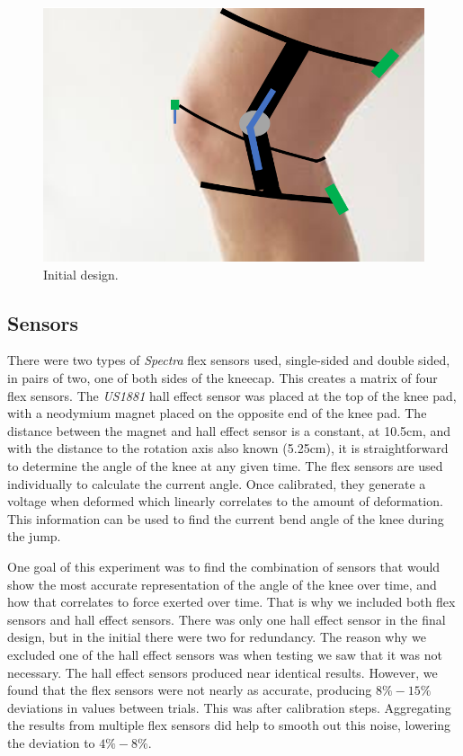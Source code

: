 \documentclass[manuscript,screen,review]{acmart}
\begin{document}
\begin{figure}[ht]
  \centering
  \includegraphics[width=0.5\linewidth]{images/initial_design.png}
  \caption{Initial design.}
  \label{fig:initial_design}
\end{figure}

\subsection{Sensors}

There were two types of \textit{Spectra} flex sensors used, single-sided and double sided, in pairs of two, one of both sides of the kneecap. This creates a matrix of four flex sensors. The \textit{US1881} hall effect sensor was placed at the top of the knee pad, with a neodymium magnet placed on the opposite end of the knee pad. The distance between the magnet and hall effect sensor is a constant, at 10.5cm, and with the distance to the rotation axis also known (5.25cm), it is straightforward to determine the angle of the knee at any given time. The flex sensors are used individually to calculate the current angle. Once calibrated, they generate a voltage when deformed which linearly correlates to the amount of deformation. This information can be used to find the current bend angle of the knee during the jump.

One goal of this experiment was to find the combination of sensors that would show the most accurate representation of the angle of the knee over time, and how that correlates to force exerted over time. That is why we included both flex sensors and hall effect sensors. There was only one hall effect sensor in the final design, but in the initial there were two for redundancy. The reason why we excluded one of the hall effect sensors was when testing we saw that it was not necessary. The hall effect sensors produced near identical results. However, we found that the flex sensors were not nearly as accurate, producing $8\%-15\%$ deviations in values between trials. This was after calibration steps. Aggregating the results from multiple flex sensors did help to smooth out this noise, lowering the deviation to $4\%-8\%$.
\end{document}
